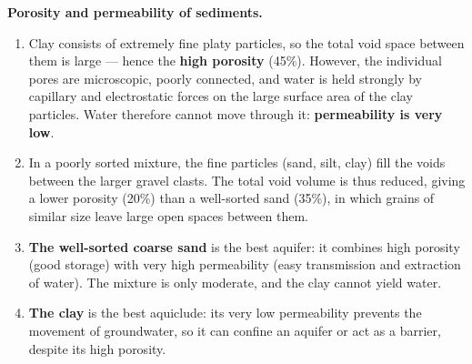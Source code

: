 \documentclass[11pt]{article}
\begin{document}
\begin{corrige}[Exercise 7]
\textbf{Porosity and permeability of sediments.}
\begin{enumerate}
\item Clay consists of extremely fine platy particles, so the total void space between them is large — hence the \textbf{high porosity} (45\%). However, the individual pores are microscopic, poorly connected, and water is held strongly by capillary and electrostatic forces on the large surface area of the clay particles. Water therefore cannot move through it: \textbf{permeability is very low}.
\item In a poorly sorted mixture, the fine particles (sand, silt, clay) fill the voids between the larger gravel clasts. The total void volume is thus reduced, giving a lower porosity (20\%) than a well-sorted sand (35\%), in which grains of similar size leave large open spaces between them.
\item \textbf{The well-sorted coarse sand} is the best aquifer: it combines high porosity (good storage) with very high permeability (easy transmission and extraction of water). The mixture is only moderate, and the clay cannot yield water.
\item \textbf{The clay} is the best aquiclude: its very low permeability prevents the movement of groundwater, so it can confine an aquifer or act as a barrier, despite its high porosity.
\end{enumerate}
\end{corrige}
\end{document}
